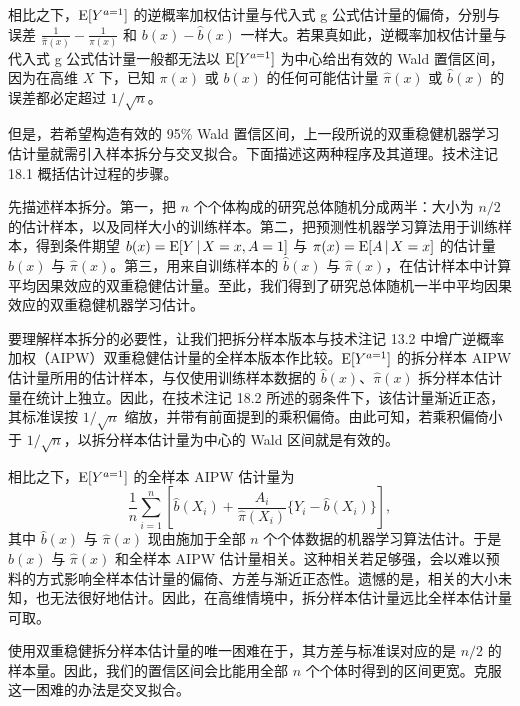 相比之下，$\mathrm{E}[Y^{a=1}]$ 的逆概率加权估计量与代入式 g 公式估计量的偏倚，分别与误差 $\frac{1}{\hat\pi(x)}-\frac{1}{\pi(x)}$ 和 $b(x)-\hat b(x)$ 一样大。若果真如此，逆概率加权估计量与代入式 g 公式估计量一般都无法以 $\mathrm{E}[Y^{a=1}]$ 为中心给出有效的 Wald 置信区间，因为在高维 $X$ 下，已知 $\pi(x)$ 或 $b(x)$ 的任何可能估计量 $\hat\pi(x)$ 或 $\hat b(x)$ 的误差都必定超过 $1/\sqrt{n}$。

但是，若希望构造有效的 95\% Wald 置信区间，上一段所说的双重稳健机器学习估计量就需引入样本拆分与交叉拟合。下面描述这两种程序及其道理。技术注记 18.1 概括估计过程的步骤。

先描述样本拆分。第一，把 $n$ 个个体构成的研究总体随机分成两半：大小为 $n/2$ 的估计样本，以及同样大小的训练样本。第二，把预测性机器学习算法用于训练样本，得到条件期望 $b(x)=\mathrm{E}[Y\,|\, X=x,A=1]$ 与 $\pi(x)=\mathrm{E}[A\,|\, X=x]$ 的估计量 $\hat b(x)$ 与 $\hat\pi(x)$。第三，用来自训练样本的 $\hat b(x)$ 与 $\hat\pi(x)$，在估计样本中计算平均因果效应的双重稳健估计量。至此，我们得到了研究总体随机一半中平均因果效应的双重稳健机器学习估计。

要理解样本拆分的必要性，让我们把拆分样本版本与技术注记 13.2 中增广逆概率加权（AIPW）双重稳健估计量的全样本版本作比较。$\mathrm{E}[Y^{a=1}]$ 的拆分样本 AIPW 估计量所用的估计样本，与仅使用训练样本数据的 $\hat b(x)$、$\hat\pi(x)$ 拆分样本估计量在统计上独立。因此，在技术注记 18.2 所述的弱条件下，该估计量渐近正态，其标准误按 $1/\sqrt{n}$ 缩放，并带有前面提到的乘积偏倚。由此可知，若乘积偏倚小于 $1/\sqrt{n}$，以拆分样本估计量为中心的 Wald 区间就是有效的。

相比之下，$\mathrm{E}[Y^{a=1}]$ 的全样本 AIPW 估计量为
\[
\frac{1}{n}\sum_{i=1}^{n}\left[\hat b(X_i)+\frac{A_i}{\hat\pi(X_i)}\bigl\{Y_i-\hat b(X_i)\bigr\}\right],
\]
其中 $\hat b(x)$ 与 $\hat\pi(x)$ 现由施加于全部 $n$ 个个体数据的机器学习算法估计。于是 $\hat b(x)$ 与 $\hat\pi(x)$ 和全样本 AIPW 估计量相关。这种相关若足够强，会以难以预料的方式影响全样本估计量的偏倚、方差与渐近正态性。遗憾的是，相关的大小未知，也无法很好地估计。因此，在高维情境中，拆分样本估计量远比全样本估计量可取。

使用双重稳健拆分样本估计量的唯一困难在于，其方差与标准误对应的是 $n/2$ 的样本量。因此，我们的置信区间会比能用全部 $n$ 个个体时得到的区间更宽。克服这一困难的办法是交叉拟合。

